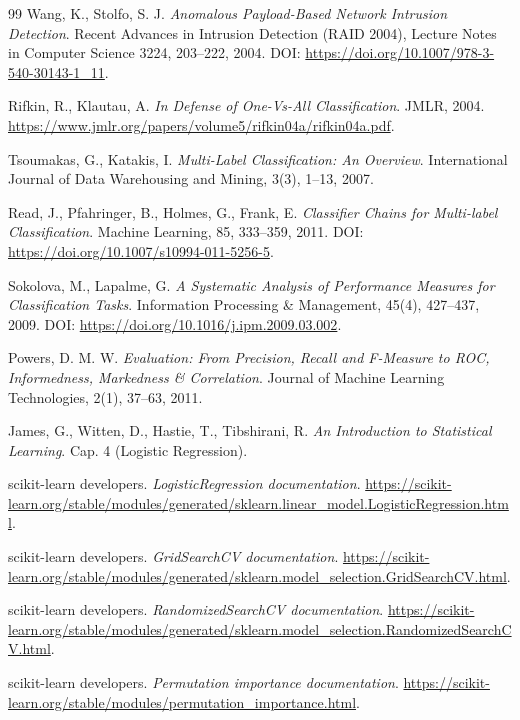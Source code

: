 \documentclass[12pt,oneside]{report}
\begin{document}
\begin{thebibliography}{99}
Wang, K., Stolfo, S. J.
\emph{Anomalous Payload-Based Network Intrusion Detection}.
Recent Advances in Intrusion Detection (RAID 2004), Lecture Notes in Computer Science 3224, 203--222, 2004. DOI: \url{https://doi.org/10.1007/978-3-540-30143-1_11}.

Rifkin, R., Klautau, A. \emph{In Defense of One-Vs-All Classification}. JMLR, 2004.
\url{https://www.jmlr.org/papers/volume5/rifkin04a/rifkin04a.pdf}.

Tsoumakas, G., Katakis, I. \emph{Multi-Label Classification: An Overview}. International Journal of Data Warehousing and Mining, 3(3), 1--13, 2007.

Read, J., Pfahringer, B., Holmes, G., Frank, E.
\emph{Classifier Chains for Multi-label Classification}.
Machine Learning, 85, 333--359, 2011. DOI: \url{https://doi.org/10.1007/s10994-011-5256-5}.

Sokolova, M., Lapalme, G.
\emph{A Systematic Analysis of Performance Measures for Classification Tasks}.
Information Processing \& Management, 45(4), 427--437, 2009. DOI: \url{https://doi.org/10.1016/j.ipm.2009.03.002}.

Powers, D. M. W.
\emph{Evaluation: From Precision, Recall and F-Measure to ROC, Informedness, Markedness \& Correlation}.
Journal of Machine Learning Technologies, 2(1), 37--63, 2011.

James, G., Witten, D., Hastie, T., Tibshirani, R. \emph{An Introduction to Statistical Learning}. Cap. 4 (Logistic Regression).

scikit-learn developers. \emph{LogisticRegression documentation}. \url{https://scikit-learn.org/stable/modules/generated/sklearn.linear_model.LogisticRegression.html}.

scikit-learn developers. \emph{GridSearchCV documentation}. \url{https://scikit-learn.org/stable/modules/generated/sklearn.model_selection.GridSearchCV.html}.

scikit-learn developers. \emph{RandomizedSearchCV documentation}. \url{https://scikit-learn.org/stable/modules/generated/sklearn.model_selection.RandomizedSearchCV.html}.

scikit-learn developers. \emph{Permutation importance documentation}. \url{https://scikit-learn.org/stable/modules/permutation_importance.html}.


\end{thebibliography}
\end{document}
